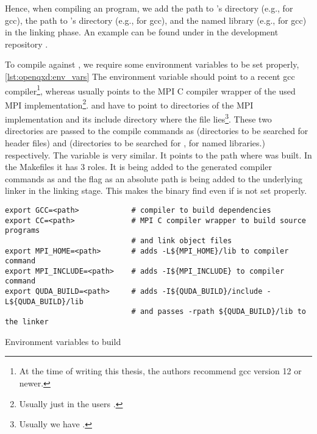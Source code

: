 
Hence, when compiling an \openqxd program, we add the path to \quda's  directory (e.g.,  for gcc), the path to \quda's  directory (e.g.,  for gcc), and the named library (e.g.,  for gcc) in the linking phase. An example  can be found under  in the \openqxd development repository \cite{gitlab:openqxd-devel}.

To compile \openqxd against \quda, we require some environment variables to be set properly, \cref{lst:openqxd:env_vars}
The environment variable  should point to a recent gcc compiler\footnote{At the time of writing this thesis, the authors recommend gcc version 12 or newer.}, whereas  usually points to the MPI C compiler wrapper of the used MPI implementation\footnote{Usually just  in the users .}.
 and  have to point to directories of the MPI implementation and its include directory where the file  lies\footnote{Usually we have .}.
These two directories are passed to the compile commands as  (directories to be searched for header files) and  (directories to be searched for , \ie for named libraries.) respectively.
The variable  is very similar.
It points to the path where \quda was built.
In the Makefiles it has 3 roles.
It is being added to the generated compiler commands as  and the flag  as an absolute path is being added to the underlying linker in the linking stage.
This makes the binary find  even if  is not set properly.
\begin{codelisting}
\begin{verbatim}
export GCC=<path>            # compiler to build dependencies
export CC=<path>             # MPI C compiler wrapper to build source programs
                             # and link object files
export MPI_HOME=<path>       # adds -L${MPI_HOME}/lib to compiler command
export MPI_INCLUDE=<path>    # adds -I${MPI_INCLUDE} to compiler command
export QUDA_BUILD=<path>     # adds -I${QUDA_BUILD}/include -L${QUDA_BUILD}/lib
                             # and passes -rpath ${QUDA_BUILD}/lib to the linker
\end{verbatim}
\caption{Environment variables to build \openqxd}
\label{lst:openqxd:env_vars}
\end{codelisting}

